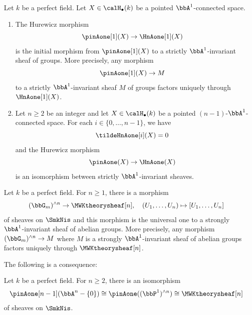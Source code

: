 \begin{theorem}
    Let $k$ be a perfect field. Let $X \in \calH_\bullet(k)$ be a pointed $\bbA^1$-connected space. 
    \begin{enumerate}
        \item \cite[Theorem 6.35]{morel_a1at} The Hurewicz morphism
        $$\pinAone[1](X) \to \HnAone[1](X)$$
        is the initial morphism from $\pinAone[1](X)$ to a strictly $\bbA^1$-invariant sheaf of groups. More precisely, any morphism
        $$\pinAone[1](X) \to M$$
        to a strictly $\bbA^1$-invariant sheaf $M$ of groups factors uniquely through $\HnAone[1](X)$.

        \item  \cite[Theorem 6.37]{morel_a1at}  Let $n \geq 2$ be an integer and let $X \in \calH_\bullet(k)$ be a pointed $(n-1)$-$\bbA^1$-connected space. For each $i \in \{0,\ldots,n-1\}$, we have
        $$\tildeHnAone[i](X) = 0$$
        and the Hurewicz morphism
        $$\pinAone(X) \to \HnAone(X)$$
        is an isomorphism between strictly $\bbA^1$-invariant sheaves.
    \end{enumerate}
\end{theorem}

\begin{theorem}
    Let $k$ be a perfect field. For $n \geq 1$, there is a morphism
    $$(\bbG_m)^{\wedge n} \to \MWKtheorysheaf[n], \quad (U_1,\ldots,U_n) \mapsto [U_1,\ldots,U_n]$$
    of sheaves on $\SmkNis$ and this morphism is the universal one to a strongly $\bbA^1$-invariant sheaf of abelian groups. More precisely, any morphism $(\bbG_m)^{\wedge n} \to M$ where $M$ is a strongly $\bbA^1$-invariant sheaf of abelian groups factors uniquely through $\MWKtheorysheaf[n]$.
\end{theorem}

The following is a consequence:

\begin{theorem}
    Let $k$ be a perfect field. For $n \geq 2$, there is an isomorphism 
    $$\pinAone[n-1](\bbA^n - \{0\}) \cong \pinAone((\bbP^1)^{\wedge n}) \cong \MWKtheorysheaf[n]$$ 
    of sheaves on $\SmkNis$.
\end{theorem}



